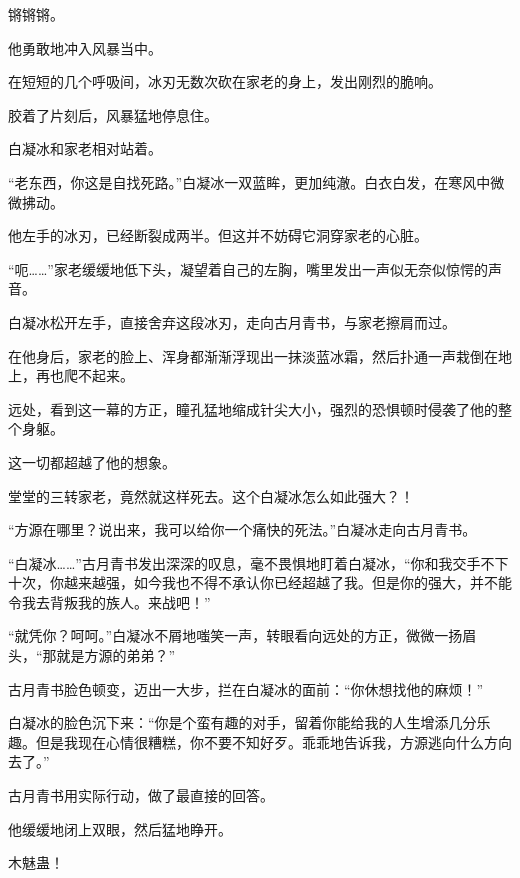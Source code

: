 \begin{this_body}
锵锵锵。

他勇敢地冲入风暴当中。

在短短的几个呼吸间，冰刃无数次砍在家老的身上，发出刚烈的脆响。

胶着了片刻后，风暴猛地停息住。

白凝冰和家老相对站着。

“老东西，你这是自找死路。”白凝冰一双蓝眸，更加纯澈。白衣白发，在寒风中微微拂动。

他左手的冰刃，已经断裂成两半。但这并不妨碍它洞穿家老的心脏。

“呃……”家老缓缓地低下头，凝望着自己的左胸，嘴里发出一声似无奈似惊愕的声音。

白凝冰松开左手，直接舍弃这段冰刃，走向古月青书，与家老擦肩而过。

在他身后，家老的脸上、浑身都渐渐浮现出一抹淡蓝冰霜，然后扑通一声栽倒在地上，再也爬不起来。

远处，看到这一幕的方正，瞳孔猛地缩成针尖大小，强烈的恐惧顿时侵袭了他的整个身躯。

这一切都超越了他的想象。

堂堂的三转家老，竟然就这样死去。这个白凝冰怎么如此强大？！

“方源在哪里？说出来，我可以给你一个痛快的死法。”白凝冰走向古月青书。

“白凝冰……”古月青书发出深深的叹息，毫不畏惧地盯着白凝冰，“你和我交手不下十次，你越来越强，如今我也不得不承认你已经超越了我。但是你的强大，并不能令我去背叛我的族人。来战吧！”

“就凭你？呵呵。”白凝冰不屑地嗤笑一声，转眼看向远处的方正，微微一扬眉头，“那就是方源的弟弟？”

古月青书脸色顿变，迈出一大步，拦在白凝冰的面前：“你休想找他的麻烦！”

白凝冰的脸色沉下来：“你是个蛮有趣的对手，留着你能给我的人生增添几分乐趣。但是我现在心情很糟糕，你不要不知好歹。乖乖地告诉我，方源逃向什么方向去了。”

古月青书用实际行动，做了最直接的回答。

他缓缓地闭上双眼，然后猛地睁开。

木魅蛊！

\end{this_body}

